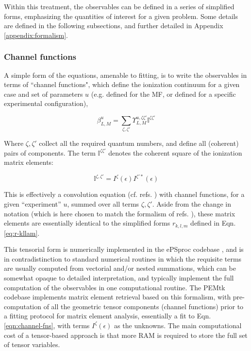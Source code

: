 Within this treatment, the observables can be defined in a series of simplified forms, emphasizing the quantities of interest for a given problem. Some details are defined in the following subsections, and further detailed in Appendix \ref{appendix:formalism}.


\subsubsection{Channel functions}

A simple form of the equations, amenable to fitting, is to write the observables in terms of ``channel functions", which define the ionization continuum for a given case and set of parameters $u$ (e.g. defined for the MF, or defined for a specific experimental configuration),

\begin{equation}
\beta_{L,M}^{u}=\sum_{\zeta,\zeta'}\varUpsilon_{L,M}^{u,\zeta\zeta'}\mathbb{I}^{\zeta\zeta'}\label{eqn:channel-fns}
\end{equation}


Where $\zeta,\zeta'$ collect all the required quantum numbers, and define all (coherent) pairs of components. The term $\mathbb{I}^{\zeta\zeta'}$ denotes the coherent square of the ionization matrix elements:

\begin{equation}
\mathbb{I}^{\zeta,\zeta'}=I^{\zeta}(\epsilon)I^{\zeta'*}(\epsilon)
\end{equation}

This is effectively a convolution equation (cf. refs. \cite{Reid2000,gregory2021MolecularFramePhotoelectron}) with channel functions, for a given ``experiment'' $u$, summed over all terms $\zeta,\zeta'$. Aside from the change in notation (which is here chosen to match the formalism of refs. \cite{Gianturco1994, Lucchese1986, Natalense1999}), these matrix elements are essentially identical to the simplified forms $r_{k,l,m}$ defined in Eqn. \ref{eq:r-kllam}. 

This tensorial form is numerically implemented in the ePSproc codebase \cite{ePSprocGithub}, and is in contradistinction to standard numerical routines in which the requisite terms are usually computed from vectorial and/or nested summations, which can be somewhat opaque to detailed interpretation, and typically implement the full computation of the observables in one computational routine. The PEMtk codebase \cite{hockett2021PhotoelectronMetrologyToolkit} implements matrix element retrieval based on this formalism, with pre-computation of all the geometric tensor components (channel functions) prior to a fitting protocol for matrix element analysis, essentially a fit to Eqn. \ref{eqn:channel-fns}, with terms $I^{\zeta}(\epsilon)$ as the unknowns. The main computational cost of a tensor-based approach is that more RAM is required to store the full set of tensor variables.

